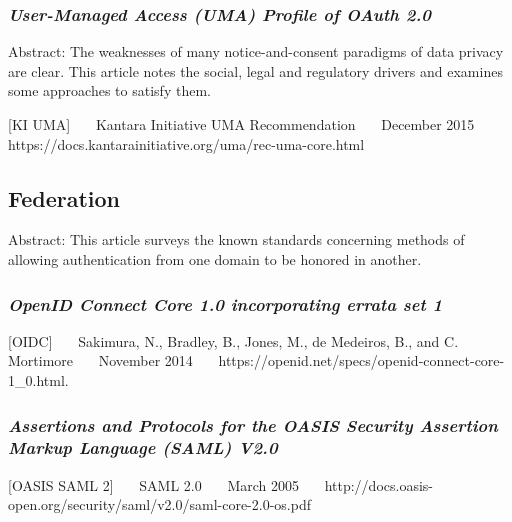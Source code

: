 \hypertarget{user-managed-access-uma-profile-of-oauth-2.0}{%
\subsubsection{\texorpdfstring{\emph{User-Managed Access (UMA) Profile of
OAuth
2.0}}{User-Managed Access (UMA) Profile of OAuth 2.0}}\label{user-managed-access-uma-profile-of-oauth-2.0}}

Abstract: The weaknesses of many notice-and-consent paradigms of data
privacy are clear. This article notes the social, legal and regulatory
drivers and examines some approaches to satisfy them.

{[}KI UMA{]}~~~ Kantara Initiative UMA Recommendation~~~ December
2015~~~ https://docs.kantarainitiative.org/uma/rec-uma-core.html~~~

\hypertarget{federation}{%
\subsection{Federation}\label{federation}}

Abstract: This article surveys the known standards concerning methods of
allowing authentication from one domain to be honored in another.

\hypertarget{openid-connect-core-1.0-incorporating-errata-set-1-1}{%
\subsubsection{\texorpdfstring{\emph{OpenID Connect Core 1.0 incorporating
errata set
1}}{OpenID Connect Core 1.0 incorporating errata set 1}}\label{openid-connect-core-1.0-incorporating-errata-set-1-1}}

{[}OIDC{]}~~~ Sakimura, N., Bradley, B., Jones, M., de Medeiros, B., and
C. Mortimore~~~ November 2014~~~
https://openid.net/specs/openid-connect-core-1\_0.html.~~~

\hypertarget{assertions-and-protocols-for-the-oasis-security-assertion-markup-language-saml-v2.0}{%
\subsubsection{\texorpdfstring{\emph{Assertions and Protocols for the OASIS
Security Assertion Markup Language (SAML)
V2.0}}{Assertions and Protocols for the OASIS Security Assertion Markup Language (SAML) V2.0}}\label{assertions-and-protocols-for-the-oasis-security-assertion-markup-language-saml-v2.0}}

{[}OASIS SAML 2{]}~~~ SAML 2.0~~~ March 2005~~~
http://docs.oasis-open.org/security/saml/v2.0/saml-core-2.0-os.pdf~~~

